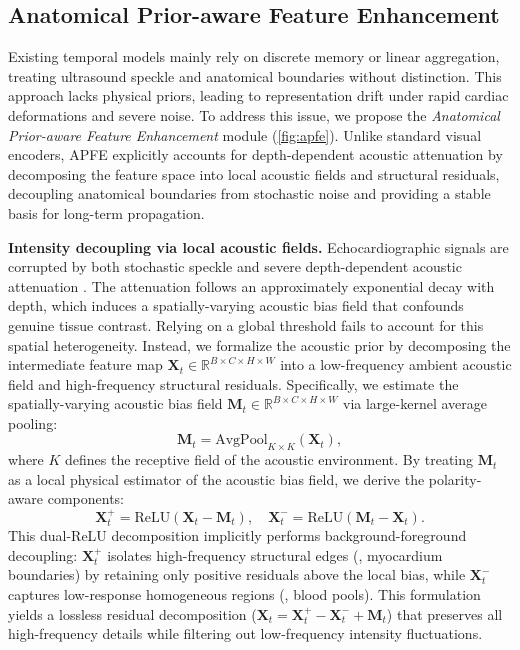 \subsection{Anatomical Prior-aware Feature Enhancement}
\label{subsec:apfe}

Existing temporal models \cite{deng2024memsam,mm25_echovim,ICCV25_gdkvm} mainly rely on discrete memory or linear aggregation, treating ultrasound speckle and anatomical boundaries without distinction.
This approach lacks physical priors, leading to representation drift under rapid cardiac deformations and severe noise.
To address this issue, we propose the \emph{Anatomical Prior-aware Feature Enhancement} module (\cref{fig:apfe}).
Unlike standard visual encoders, APFE explicitly accounts for depth-dependent acoustic attenuation by decomposing the feature space into local acoustic fields and structural residuals, decoupling anatomical boundaries from stochastic noise and providing a stable basis for long-term propagation.

\noindent
\textbf{Intensity decoupling via local acoustic fields.}
Echocardiographic signals are corrupted by both stochastic speckle and severe depth-dependent acoustic attenuation \cite{8265568,WANG201925}.
The attenuation follows an approximately exponential decay with depth, which induces a spatially-varying acoustic bias field that confounds genuine tissue contrast.
Relying on a global threshold fails to account for this spatial heterogeneity.
Instead, we formalize the acoustic prior by decomposing the intermediate feature map $\mathbf{X}_t \in \mathbb{R}^{B\times C\times H\times W}$ into a low-frequency ambient acoustic field and high-frequency structural residuals.
Specifically, we estimate the spatially-varying acoustic bias field $\mathbf{M}_t \in \mathbb{R}^{B\times C\times H\times W}$ via large-kernel average pooling:
\begin{equation}
    \mathbf{M}_t = \mathrm{AvgPool}_{K \times K}(\mathbf{X}_t),
\end{equation}
where $K$ defines the receptive field of the acoustic environment.
By treating $\mathbf{M}_t$ as a local physical estimator of the acoustic bias field, we derive the polarity-aware components:
\begin{equation}
    \mathbf{X}_t^{+} = \mathrm{ReLU}(\mathbf{X}_t - \mathbf{M}_t), \quad \mathbf{X}_t^{-} = \mathrm{ReLU}(\mathbf{M}_t - \mathbf{X}_t).
\end{equation}
This dual-ReLU decomposition implicitly performs background-foreground decoupling: $\mathbf{X}_t^{+}$ isolates high-frequency structural edges (\eg, myocardium boundaries) by retaining only positive residuals above the local bias, while $\mathbf{X}_t^{-}$ captures low-response homogeneous regions (\eg, blood pools).
This formulation yields a lossless residual decomposition ($\mathbf{X}_t = \mathbf{X}_t^{+} - \mathbf{X}_t^{-} + \mathbf{M}_t$) that preserves all high-frequency details while filtering out low-frequency intensity fluctuations.

